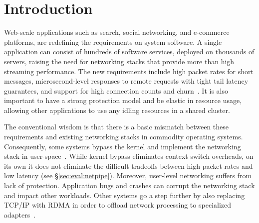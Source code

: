 
\section{Introduction}
\label{sec:intro}


Web-scale applications such as search, social networking, and
e-commerce platforms, are redefining the requirements on system
software. A single application can consist of hundreds of software
services, deployed on thousands of servers, raising the need for
networking stacks that provide more than high streaming performance.
The new requirements include high packet rates for short messages,
microsecond-level responses to remote requests with tight tail latency
guarantees, and support for high connection counts and
churn~\cite{Atikoglu:2012:WAL,DBLP:journals/cacm/DeanB13,DBLP:conf/nsdi/NishtalaFGKLLMPPSSTV13}.
It is also important to have a strong protection model and be elastic
in resource usage, allowing other applications to use any idling
resources in a shared
cluster. %

The conventional wisdom is that there is a basic mismatch between
these requirements and existing networking stacks in commodity
operating systems. Consequently, some systems bypass the kernel and
implement the networking stack in
user-space~\cite{jeong2014mtcp,DBLP:conf/cloud/KapoorPTVV12,sandstorm,openonload,DBLP:conf/sigcomm/ThekkathNML93}.
While kernel bypass eliminates context switch overheads, on its own it
does not eliminate the difficult tradeoffs between high packet rates
and low latency (see \S\ref{sec:eval:netpipe}). Moreover, user-level
networking suffers from lack of protection. Application bugs and
crashes can corrupt the networking stack and impact other workloads.
Other systems go a step further by also replacing TCP/IP with RDMA in
order to offload network processing to specialized
adapters~\cite{dragojevic14farm,DBLP:conf/icpp/JoseSLZHWIOWSP11,mitchell:rdma,DBLP:conf/sosp/OngaroRSOR11}.

